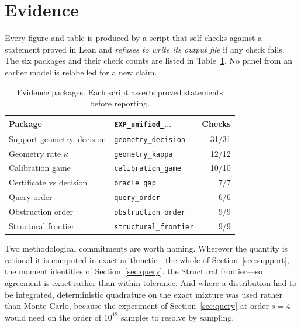 
\section{Evidence}
\label{sec:evidence}

Every figure and table is produced by a script that self-checks against a statement proved
in Lean and \emph{refuses to write its output file} if any check fails. The six packages
and their check counts are listed in Table~\ref{tab:evidence}. No panel from an earlier
model is relabelled for a new claim.

\begin{table}[t]
\caption{Evidence packages. Each script asserts proved statements before reporting.}
\label{tab:evidence}
\centering
\footnotesize
\begin{tabular}{@{}llr@{}}
\toprule
Package & \texttt{EXP\_unified\_}$\ldots$ & Checks \\
\midrule
Support geometry, decision & \texttt{geometry\_decision} & 31/31 \\
Geometry rate $\kappa$ & \texttt{geometry\_kappa} & 12/12 \\
Calibration game & \texttt{calibration\_game} & 10/10 \\
Certificate vs decision & \texttt{oracle\_gap} & 7/7 \\
Query order & \texttt{query\_order} & 6/6 \\
Obstruction order & \texttt{obstruction\_order} & 9/9 \\
Structural frontier & \texttt{structural\_frontier} & 9/9 \\
\bottomrule
\end{tabular}
\end{table}

Two methodological commitments are worth naming. Wherever the quantity is rational it is
computed in exact arithmetic---the whole of Section~\ref{sec:support}, the moment
identities of Section~\ref{sec:query}, the Structural frontier---so agreement is exact
rather than within tolerance. And where a distribution had to be integrated, deterministic
quadrature on the exact mixture was used rather than Monte Carlo, because the experiment of
Section~\ref{sec:query} at order $s=4$ would need on the order of $10^{12}$ samples to
resolve by sampling.

